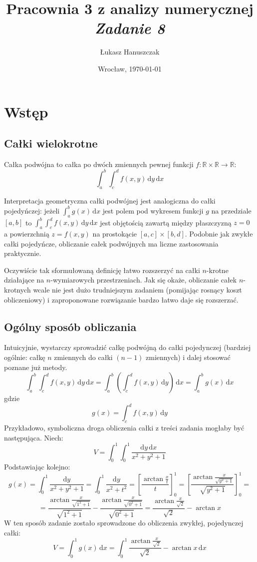 \documentclass[11pt,leqno]{article}
\title{
  \textbf{Pracownia 3 z analizy numerycznej}\\
  \textit{Zadanie 8}
}
\author{Łukasz Hanuszczak}
\date{Wrocław, \today}
\begin{document}
\maketitle


\section{Wstęp}

\subsection{Całki wielokrotne}
Całka podwójna to całka po dwóch zmiennych pewnej funkcji $f: \mathbb{R} \times \mathbb{R} \to \mathbb{R}$:
\[
  \int_a^b \int_c^d f(x, y) \,\mathrm{d}y \,\mathrm{d}x
\]

Interpretacja geometryczna całki podwójnej jest analogiczna do całki pojedyńczej: jeżeli $\int_a^b g(x) \,\mathrm{d}x$ jest polem pod wykresem funkcji $g$ na przedziale $[a, b]$ to $\int_a^b \int_c^d f(x, y) \,\mathrm{d}y \,\mathrm{d}x$ jest objętością zawartą między płaszczyzną $z = 0$ a powierzchnią $z = f(x, y)$ na prostokącie $[a, c] \times [b, d]$. Podobnie jak zwykłe całki pojedyńcze, obliczanie całek podwójnych ma liczne zastosowania praktycznie.

Oczywiście tak sformułowaną definicję łatwo rozszerzyć na całki $n$-krotne działające na $n$-wymiarowych przestrzeniach. Jak się okaże, obliczanie całek $n$-krotnych wcale nie jest dużo trudniejszym zadaniem (pomijając rosnący koszt obliczeniowy) i zaproponowane rozwiązanie bardzo łatwo daje się rozszerzać.


\subsection{Ogólny sposób obliczania}
Intuicyjnie, wystarczy sprowadzić całkę podwójną do całki pojedynczej (bardziej ogólnie: całkę $n$ zmiennych do całki $(n - 1)$ zmiennych) i dalej stosować poznane już metody.
\[
  \int_a^b \int_c^d f(x, y) \,\mathrm{d}y \,\mathrm{d}x
=
  \int_a^b \left( \int_c^d f(x, y) \,\mathrm{d}y \right) \,\mathrm{d}x
=
  \int_a^b g(x) \,\mathrm{d}x
\]
gdzie
\[
  g(x) = \int_c^d f(x, y) \,\mathrm{d}y
\]
Przykładowo, symboliczna droga obliczenia całki z treści zadania mogłaby być następująca. Niech:
\[
  V = \int_0^1 \int_0^1 \frac{\mathrm{d}y \,\mathrm{d}x}{x^2 + y^2 + 1}
\]
Podstawiając kolejno:
\[
  g(x)
=
  \int_0^1 \frac{\mathrm{d}y}{x^2 + y^2 + 1}
=
  \int_0^1 \frac{\mathrm{d}y}{x^2 + t^2}
=
  \left[ \frac{\arctan \frac{x}{t}}{t} \right]_0^1
=
  \left[ \frac{\arctan \frac{x}{\sqrt{y^2 + 1}}}{\sqrt{y^2 + 1}} \right]_0^1
=
\]
\[
=
  \frac{\arctan \frac{x}{\sqrt{1^2 + 1}}}{\sqrt{1^2 + 1}}
  -
  \frac{\arctan \frac{x}{\sqrt{0^2 + 1}}}{\sqrt{0^2 + 1}}   
=
  \frac{\arctan \frac{x}{\sqrt{2}}}{\sqrt{2}} - \arctan x   
\]
W ten sposób zadanie zostało sprowadzone do obliczenia zwykłej, pojedynczej całki:
\[
  V
=
  \int_0^1 g(x) \,\mathrm{d}x
=
  \int_0^1
    \frac{\arctan \frac{x}{\sqrt{2}}}{\sqrt{2}} - \arctan x
  \,\mathrm{d}x
\]
\end{document}
